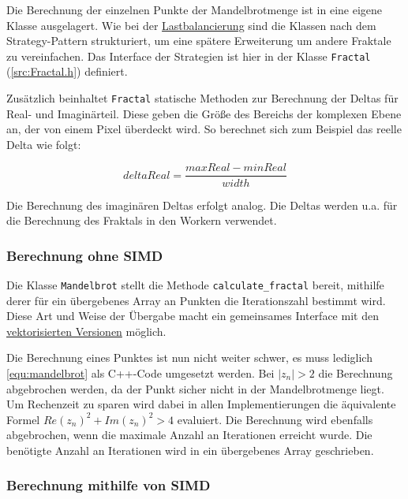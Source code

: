 Die Berechnung der einzelnen Punkte der Mandelbrotmenge ist in eine eigene Klasse ausgelagert.
Wie bei der \hyperref[sec:load_balancing]{Lastbalancierung} sind die Klassen nach dem Strategy-Pattern strukturiert, um eine spätere Erweiterung um andere Fraktale zu vereinfachen.
Das Interface der Strategien ist hier in der Klasse \verb|Fractal| (\autoref{src:Fractal.h}) definiert.

\begin{figure}
	
\end{figure}

Zusätzlich beinhaltet \verb|Fractal| statische Methoden zur Berechnung der Deltas für Real- und Imaginärteil.
Diese geben die Größe des Bereichs der komplexen Ebene an, der von einem Pixel überdeckt wird.
So berechnet sich zum Beispiel das reelle Delta wie folgt:

\begin{equation*}
	deltaReal = \frac{maxReal - minReal}{width}
\end{equation*}

Die Berechnung des imaginären Deltas erfolgt analog.
Die Deltas werden u.a. für die Berechnung des Fraktals in den Workern verwendet.

\subsubsection{Berechnung ohne SIMD}

Die Klasse \verb|Mandelbrot| stellt die Methode \verb|calculate_fractal| bereit,
mithilfe derer für ein übergebenes Array an Punkten die Iterationszahl bestimmt wird.
Diese Art und Weise der Übergabe macht ein gemeinsames Interface mit den \hyperref[subsec:simd]{vektorisierten Versionen} möglich.

Die Berechnung eines Punktes ist nun nicht weiter schwer, es muss lediglich \autoref{equ:mandelbrot} als C++-Code umgesetzt werden.
Bei $|z_n| > 2$ die Berechnung abgebrochen werden, da der Punkt sicher nicht in der Mandelbrotmenge liegt.
Um Rechenzeit zu sparen wird dabei in allen Implementierungen die äquivalente Formel $Re(z_n)^2 + Im(z_n)^2 > 4$ evaluiert.
Die Berechnung wird ebenfalls abgebrochen, wenn die maximale Anzahl an Iterationen erreicht wurde.
Die benötigte Anzahl an Iterationen wird in ein übergebenes Array geschrieben.

\subsubsection{Berechnung mithilfe von SIMD}\label{subsec:simd}

